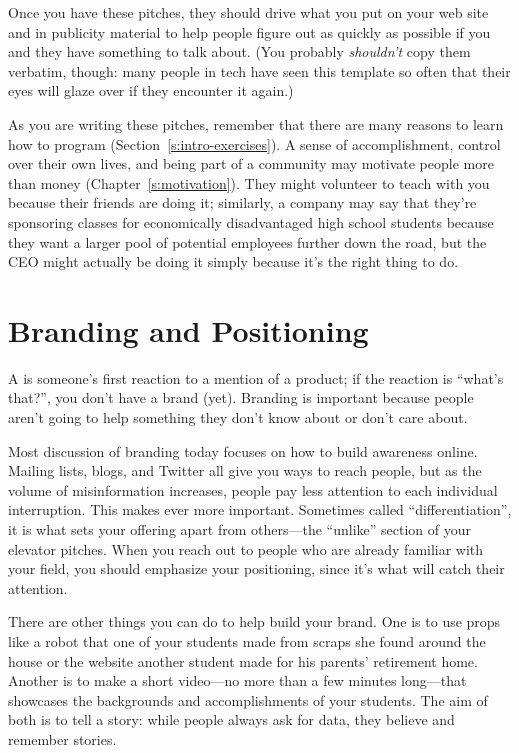 Once you have these pitches,
they should drive what you put on your web site and in publicity material
to help people figure out as quickly as possible
if you and they have something to talk about.
(You probably \emph{shouldn't} copy them verbatim,
though:
many people in tech have seen this template so often that
their eyes will glaze over if they encounter it again.)

As you are writing these pitches,
remember that there are many reasons to learn how to program
(Section~\ref{s:intro-exercises}).
A sense of accomplishment,
control over their own lives,
and being part of a community may motivate people more than money
(Chapter~\ref{s:motivation}).
They might volunteer to teach with you because their friends are doing it;
similarly,
a company may say that they're sponsoring classes for economically disadvantaged high school students
because they want a larger pool of potential employees further down the road,
but the CEO might actually be doing it simply because it's the right thing to do.

\section{Branding and Positioning}\label{s:marketing-branding}

A  is someone's first reaction to a mention of a product;
if the reaction is ``what's that?'',
you don't have a brand (yet).
Branding is important because
people aren't going to help something they don't know about or don't care about.

Most discussion of branding today focuses on
how to build awareness online.
Mailing lists,
blogs,
and Twitter all give you ways to reach people,
but as the volume of misinformation increases,
people pay less attention to each individual interruption.
This makes  ever more important.
Sometimes called ``differentiation'',
it is what sets your offering apart from others---the ``unlike'' section of your elevator pitches.
When you reach out to people who are already familiar with your field,
you should emphasize your positioning,
since it's what will catch their attention.

There are other things you can do to help build your brand.
One is to use props
like a robot that one of your students made from scraps she found around the house
or the website another student made for his parents' retirement home.
Another is to make a short video---no more than a few minutes long---that showcases
the backgrounds and accomplishments of your students.
The aim of both is to tell a story:
while people always ask for data,
they believe and remember stories.

